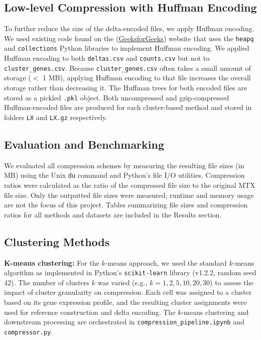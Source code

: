 \documentclass[unnumsec,webpdf,contemporary,large]{oup-authoring-template}
\begin{document}
\subsection{Low-level Compression with Huffman Encoding}
To further reduce the size of the delta-encoded files, we apply Huffman encoding. We used existing code found on the (\href{https://www.geeksforgeeks.org/huffman-coding-in-python/}{GeeksforGeeks}) website that uses the \texttt{heapq} and \texttt{collections} Python libraries to implement Huffman encoding. We applied Huffman encoding to both \texttt{deltas.csv} and \texttt{counts.csv} but not to \texttt{cluster\_genes.csv}. Because \texttt{cluster\_genes.csv} often takes a small amount of storage ($<$ 1 MB), applying Huffman encoding to that file increases the overall storage rather than decreasing it. The Huffman trees for both encoded files are stored as a pickled \texttt{.pkl} object. Both uncompressed and gzip-compressed Huffman-encoded files are produced for each cluster-based method and stored in folders \texttt{LX} and \texttt{LX.gz} respectively.

\subsection{Evaluation and Benchmarking}
We evaluated all compression schemes by measuring the resulting file sizes (in MB) using the Unix \texttt{du} command and Python's file I/O utilities. Compression ratios were calculated as the ratio of the compressed file size to the original MTX file size. Only the outputted file sizes were measured; runtime and memory usage are not the focus of this project. Tables summarizing file sizes and compression ratios for all methods and datasets are included in the Results section.

\subsection{Clustering Methods}
\textbf{K-means clustering:} For the $k$-means approach, we used the standard $k$-means algorithm as implemented in Python's \texttt{scikit-learn} library (v1.2.2, random seed 42). The number of clusters $k$ was varied (e.g., $k=1,2,5,10,20,30$) to assess the impact of cluster granularity on compression. Each cell was assigned to a cluster based on its gene expression profile, and the resulting cluster assignments were used for reference construction and delta encoding. The $k$-means clustering and downstream processing are orchestrated in \texttt{compression\_pipeline.ipynb} and \texttt{compressor.py}.
\end{document}
